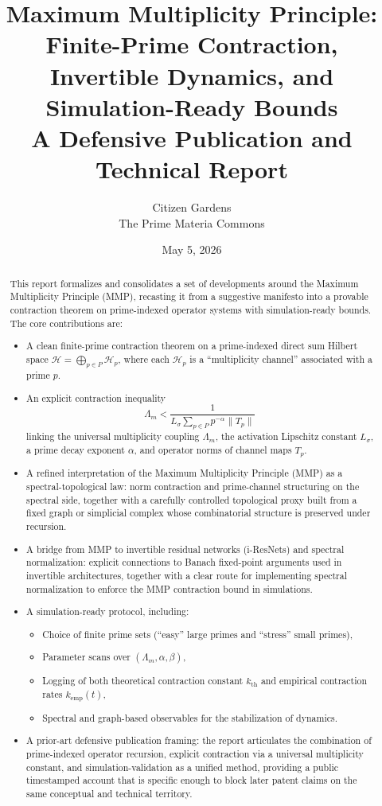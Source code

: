 \documentclass[12pt]{article}
\title{Maximum Multiplicity Principle:\\
Finite-Prime Contraction, Invertible Dynamics, and Simulation-Ready Bounds\\[4pt]
\large A Defensive Publication and Technical Report}
\author{Citizen Gardens \\ The Prime Materia Commons}
\date{May 5, 2026}
\begin{document}
\maketitle
\begin{abstract}

This report formalizes and consolidates a set of developments around the Maximum Multiplicity Principle (MMP), recasting it from a suggestive manifesto into a provable contraction theorem on prime-indexed operator systems with simulation-ready bounds. The core contributions are:

\begin{itemize}
  \item A clean finite-prime contraction theorem on a prime-indexed direct sum Hilbert space
        \(\mathcal{H} = \bigoplus_{p\in P} \mathcal{H}_p\), where each \(\mathcal{H}_p\) is a ``multiplicity channel'' associated with a prime \(p\).
  \item An explicit contraction inequality
        \[
          \Lambda_m < \frac{1}{L_\sigma \sum_{p\in P} p^{-\alpha}\|T_p\|}
        \]
        linking the universal multiplicity coupling \(\Lambda_m\), the activation Lipschitz constant \(L_\sigma\), a prime decay exponent \(\alpha\), and operator norms of channel maps \(T_p\).
  \item A refined interpretation of the Maximum Multiplicity Principle (MMP) as a spectral-topological law: norm contraction and prime-channel structuring on the spectral side, together with a carefully controlled topological proxy built from a fixed graph or simplicial complex whose combinatorial structure is preserved under recursion.
  \item A bridge from MMP to invertible residual networks (i-ResNets) and spectral normalization: explicit connections to Banach fixed-point arguments used in invertible architectures, together with a clear route for implementing spectral normalization to enforce the MMP contraction bound in simulations.
  \item A simulation-ready protocol, including:
        \begin{itemize}
          \item Choice of finite prime sets (``easy'' large primes and ``stress'' small primes),
          \item Parameter scans over \((\Lambda_m,\alpha,\beta)\),
          \item Logging of both theoretical contraction constant \(k_{\text{th}}\) and empirical contraction rates \(k_{\text{emp}}(t)\),
          \item Spectral and graph-based observables for the stabilization of dynamics.
        \end{itemize}
  \item A prior-art defensive publication framing: the report articulates the combination of prime-indexed operator recursion, explicit contraction via a universal multiplicity constant, and simulation-validation as a unified method, providing a public timestamped account that is specific enough to block later patent claims on the same conceptual and technical territory.
\end{itemize}


\end{abstract}
\end{document}
